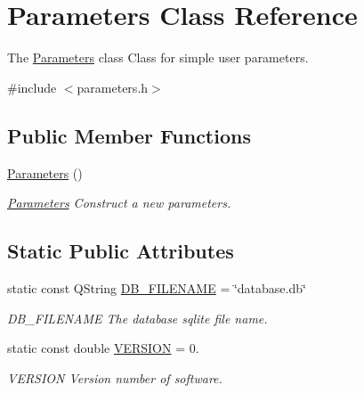 \hypertarget{classParameters}{\section{Parameters Class Reference}
\label{classParameters}
}


The \hyperlink{classParameters}{Parameters} class Class for simple user parameters.  




{\ttfamily \#include $<$parameters.\+h$>$}

\subsection*{Public Member Functions}
\begin{DoxyCompactItemize}
\item 
\hypertarget{classParameters_af4d94ee360ac0157d9065f78797fe9a1}{\hyperlink{classParameters_af4d94ee360ac0157d9065f78797fe9a1}{Parameters} ()}\label{classParameters_af4d94ee360ac0157d9065f78797fe9a1}

\begin{DoxyCompactList}\small\item\em \hyperlink{classParameters}{Parameters} Construct a new parameters. \end{DoxyCompactList}\end{DoxyCompactItemize}
\subsection*{Static Public Attributes}
\begin{DoxyCompactItemize}
\item 
static const Q\+String \hyperlink{classParameters_a80b98bd51d910bcc2203afcacbc7df87}{D\+B\+\_\+\+F\+I\+L\+E\+N\+A\+M\+E} = \char`\"{}database.\+db\char`\"{}
\begin{DoxyCompactList}\small\item\em D\+B\+\_\+\+F\+I\+L\+E\+N\+A\+M\+E The database sqlite file name. \end{DoxyCompactList}\item 
static const double \hyperlink{classParameters_a279ee24140c761de46178daa8960bdc8}{V\+E\+R\+S\+I\+O\+N} = 0.
\begin{DoxyCompactList}\small\item\em V\+E\+R\+S\+I\+O\+N Version number of software. \end{DoxyCompactList}\end{DoxyCompactItemize}


